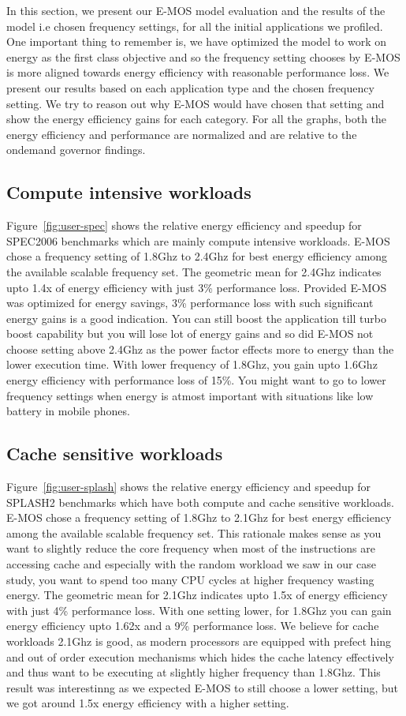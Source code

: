 In this section, we present our E-MOS model evaluation and the
results of the model i.e chosen frequency settings, for all the initial applications we profiled.
One important thing to remember is, we have optimized the model to 
work on energy as the first class objective and so the frequency setting chooses
by E-MOS is more aligned towards energy efficiency with reasonable performance loss.
We present our results based on each application type and the chosen frequency setting. 
We try to reason out why E-MOS would have chosen that setting and show the energy efficiency gains
for each category. For all the graphs, both the energy efficiency and performance are normalized
and are relative to the ondemand governor findings.

\subsection{Compute intensive workloads}
Figure~\ref{fig:user-spec} shows the relative energy efficiency and speedup
for SPEC2006 benchmarks which are mainly compute intensive workloads. 
E-MOS chose a frequency setting of 1.8Ghz to 2.4Ghz for best energy efficiency
among the available scalable frequency set. The geometric mean for 2.4Ghz indicates  
upto 1.4x of energy efficiency with just 3\% performance loss. Provided 
E-MOS was optimized for energy savings, 3\% performance loss with such significant energy gains
is a good indication. You can still boost the application till turbo boost capability
but you will lose lot of energy gains and so did E-MOS not choose setting
above 2.4Ghz as the power factor effects more to energy than the lower execution time.
With lower frequency of 1.8Ghz, you gain upto 1.6Ghz energy efficiency with performance loss
of 15\%. You might want to go to lower frequency settings when energy is atmost important with situations like
low battery in mobile phones.

\subsection{Cache sensitive workloads}
Figure~\ref{fig:user-splash} shows the relative energy efficiency and speedup
for SPLASH2 benchmarks which have both compute and cache sensitive workloads. 
E-MOS chose a frequency setting of 1.8Ghz to 2.1Ghz for best energy efficiency
among the available scalable frequency set. This rationale makes sense
as you want to slightly reduce the core frequency when most of the instructions
are accessing cache and especially with the random workload we saw in our case study,
you want to spend too many CPU cycles at higher frequency wasting energy.
The geometric mean for 2.1Ghz indicates  
upto 1.5x of energy efficiency with just 4\% performance loss.
With one setting lower, for 1.8Ghz you can gain energy efficiency upto 1.62x and a 9\% performance loss.
We believe for cache workloads 2.1Ghz is good, as modern processors are equipped with
prefect hing and out of order execution mechanisms which hides the cache latency effectively and thus 
want to be executing at slightly higher frequency than 1.8Ghz.
This result was interestinng as we expected E-MOS to still choose a lower setting, but we 
got around 1.5x energy efficiency with a higher setting.

